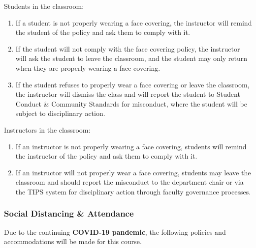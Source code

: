\documentclass[12pt]{scrartcl}
\begin{document}
Students in the classroom:
\begin{enumerate}
  \item If a student is not properly wearing a face covering, 
  the instructor will remind the student of the policy and ask 
  them to comply with it.
  \item If the student will not comply with the face covering policy, 
  the instructor will ask the student to leave the classroom, 
  and the student may only return when they are properly wearing 
  a face covering.
  \item If the student refuses to properly wear a face covering 
  or leave the classroom, the instructor will dismiss the class 
  and will report the student to Student Conduct \& Community 
  Standards for misconduct, where the student will be subject to disciplinary action.
\end{enumerate}

Instructors in the classroom:
\begin{enumerate}
  \item If an instructor is not properly wearing a face covering, 
  students will remind the instructor of the policy and ask them 
  to comply with it.
  \item If an instructor will not properly wear a face covering, 
  students may leave the classroom and should report the misconduct 
  to the department chair or via the TIPS system for disciplinary 
  action through faculty governance processes.
\end{enumerate}

\subsubsection{Social Distancing \& Attendance}

Due to the continuing \textbf{COVID-19 pandemic}, the following 
policies and accommodations will be made for this course.  
\end{document}
